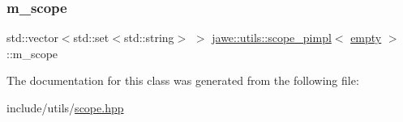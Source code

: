 \subsubsection{\texorpdfstring{m\+\_\+scope}{m\_scope}}
{\footnotesize\ttfamily std\+::vector$<$std\+::set$<$std\+::string$>$ $>$ \hyperlink{classjawe_1_1utils_1_1scope__pimpl}{jawe\+::utils\+::scope\+\_\+pimpl}$<$ \hyperlink{classjawe_1_1utils_1_1empty}{empty} $>$\+::m\+\_\+scope\hspace{0.3cm}{\ttfamily [private]}}



The documentation for this class was generated from the following file\+:\begin{DoxyCompactItemize}
\item 
include/utils/\hyperlink{scope_8hpp}{scope.\+hpp}\end{DoxyCompactItemize}
